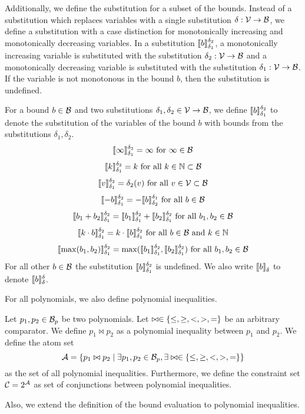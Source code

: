 Additionally, we define the substitution for a subset of the bounds.
Instead of a substitution which replaces variables with a single substitution $\delta: \mathcal{V} \rightarrow \mathcal{B}$, we define a substitution with a case distinction for monotonically increasing and monotonically decreasing variables.
In a substitution $\llbracket b \rrbracket_{\delta_1}^{\delta_2}$, a monotonically increasing variable is substituted with the substitution $\delta_2: \mathcal{V} \rightarrow \mathcal{B}$ and a monotonically decreasing variable is substituted with the substitution $\delta_1: \mathcal{V} \rightarrow \mathcal{B}$.
If the variable is not monotonous in the bound $b$, then the substitution is undefined.
\begin{definition}
  For a bound $b \in \mathcal{B}$ and two substitutions $\delta_1, \delta_2 \in \mathcal{V} \rightarrow \mathcal{B}$, we define $\llbracket b \rrbracket_{\delta_1}^{\delta_2}$ to denote the substitution of the variables of the bound $b$ with bounds from the substitutions $\delta_1, \delta_2$.
  \[ \llbracket \infty \rrbracket_{\delta_1}^{\delta_2} = \infty \text{ for } \infty \in \mathcal{B} \]
  \[ \llbracket k \rrbracket_{\delta_1}^{\delta_2} = k \text{ for all } k \in \mathbb{N} \subset \mathcal{B} \] 
  \[ \llbracket v \rrbracket_{\delta_1}^{\delta_2} = \delta_2(v) \text{ for all } v \in \mathcal{V} \subset \mathcal{B} \] 
  \[ \llbracket -b \rrbracket_{\delta_1}^{\delta_2} = -\llbracket b \rrbracket_{\delta_2}^{\delta_1} \text{ for all } b \in \mathcal{B} \] 
  \[ \llbracket b_1 + b_2 \rrbracket_{\delta_1}^{\delta_2} = \llbracket b_1 \rrbracket_{\delta_1}^{\delta_2} + \llbracket b_2 \rrbracket_{\delta_1}^{\delta_2} \text{ for all } b_1, b_2 \in \mathcal{B} \] 
  \[ \llbracket k \cdot b \rrbracket_{\delta_1}^{\delta_2} = k \cdot \llbracket b \rrbracket_{\delta_1}^{\delta_2} \text{ for all } b \in \mathcal{B} \text{ and } k \in \mathbb{N} \] 
  \[ \llbracket \max(b_1, b_2) \rrbracket_{\delta_1}^{\delta_2} = \max(\llbracket b_1 \rrbracket_{\delta_1}^{\delta_2}, \llbracket b_2 \rrbracket_{\delta_1}^{\delta_2}) \text{ for all } b_1, b_2 \in \mathcal{B} \]
  For all other $b \in \mathcal{B}$ the substitution $\llbracket b \rrbracket_{\delta_1}^{\delta_2}$ is undefined.
  We also write $\llbracket b \rrbracket_{\delta}^{}$ to denote $\llbracket b \rrbracket_{\delta}^{\delta}$.
\end{definition}

For all polynomials, we also define polynomial inequalities.

\begin{definition}
  Let $p_1, p_2 \in \mathcal{B}_p$ be two polynomials.
  Let $\bowtie \in \lbrace \leq, \geq, <, >, = \rbrace$ be an arbitrary comparator.
  We define $p_1 \bowtie p_2$ as a polynomial inequality between $p_1$ and $p_2$.
  We define the atom set
  \[ \mathcal{A} = \lbrace p_1 \bowtie p_2 \mid \exists p_1, p_2 \in \mathcal{B}_p, \exists \bowtie \in \lbrace \leq, \geq, <, >, = \rbrace \rbrace \]
  as the set of all polynomial inequalities.
  Furthermore, we define the constraint set $\mathcal{C} = 2^{\mathcal{A}}$ as set of conjunctions between polynomial inequalities.
\end{definition}
Also, we extend the definition of the bound evaluation to polynomial inequalities.

